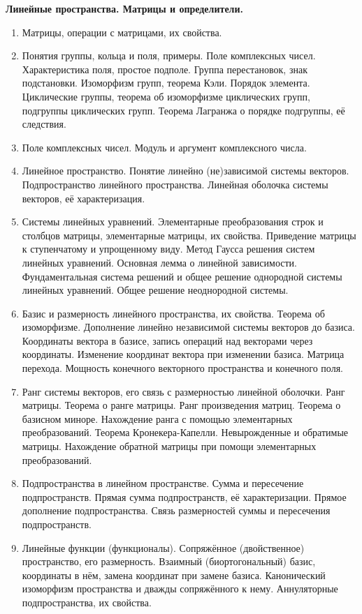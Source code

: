 \textbf{Линейные пространства. Матрицы и определители.}
\begin{enumerate}
    \item Матрицы, операции с матрицами, их свойства.
    \item Понятия группы, кольца и поля, примеры. Поле комплексных чисел. Характеристика поля, простое подполе. Группа перестановок, знак подстановки. Изоморфизм групп, теорема Кэли. Порядок элемента. Циклические группы, теорема об изоморфизме циклических групп, подгруппы циклических групп. Теорема Лагранжа о порядке подгруппы, её следствия.
    \item Поле комплексных чисел. Модуль и аргумент комплексного числа.
    \item Линейное пространство. Понятие линейно (не)зависимой системы векторов. Подпространство линейного пространства. Линейная оболочка системы векторов, её характеризация.
    \item Системы линейных уравнений. Элементарные преобразования строк и столбцов матрицы, элементарные матрицы, их свойства. Приведение матрицы к ступенчатому и упрощенному виду. Метод Гаусса решения систем линейных уравнений. Основная лемма о линейной зависимости. Фундаментальная система решений и общее решение однородной системы линейных уравнений. Общее решение неоднородной системы.
    \item Базис и размерность линейного пространства, их свойства. Теорема об изоморфизме. Дополнение линейно независимой системы векторов до базиса. Координаты вектора в базисе, запись операций над векторами через координаты. Изменение координат вектора при изменении базиса. Матрица перехода. Мощность конечного векторного пространства и конечного поля.
    \item Ранг системы векторов, его связь с размерностью линейной оболочки. Ранг матрицы. Теорема о ранге матрицы. Ранг произведения матриц. Теорема о базисном миноре. Нахождение ранга с помощью элементарных преобразований. Теорема Кронекера-Капелли. Невырожденные и обратимые матрицы. Нахождение обратной матрицы при помощи элементарных преобразований.
    \item Подпространства в линейном пространстве. Сумма и пересечение подпространств. Прямая сумма подпространств, её характеризации. Прямое дополнение подпространства. Связь размерностей суммы и пересечения подпространств.
    \item Линейные функции (функционалы). Сопряжённое (двойственное) пространство, его размерность. Взаимный (биортогональный) базис, координаты в нём, замена координат при замене базиса. Канонический изоморфизм пространства и дважды сопряжённого к нему. Аннуляторные подпространства, их свойства.

\end{enumerate}
